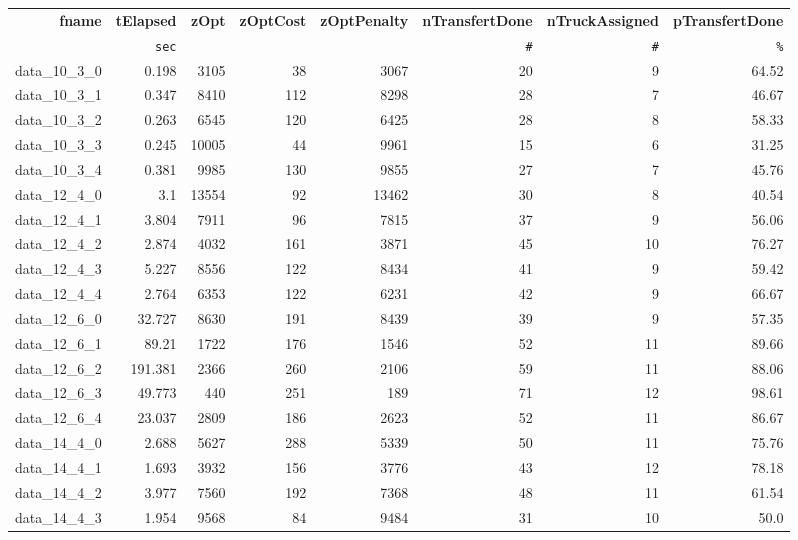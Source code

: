 \documentclass[preprint,12pt,authoryear]{elsarticle}
\begin{document}
\begin{table}[h!]
  \hspace{1.5cm}
  \vspace{0.5cm}
  \centering
{\tiny
\begin{tabular}{rrrrrrrr}
  \hline
  \textbf{fname} & \textbf{tElapsed} & \textbf{zOpt} & \textbf{zOptCost} & \textbf{zOptPenalty} & \textbf{nTransfertDone} & \textbf{nTruckAssigned} & \textbf{pTransfertDone} \\
  \texttt{ } & \texttt{sec} & \texttt{ } & \texttt{ } & \texttt{ } & \texttt{\#} & \texttt{\#} & \texttt{\%} \\\hline
  data\_10\_3\_0 & 0.198 & 3105 & 38 & 3067 & 20 & 9 & 64.52 \\
  data\_10\_3\_1 & 0.347 & 8410 & 112 & 8298 & 28 & 7 & 46.67 \\
  data\_10\_3\_2 & 0.263 & 6545 & 120 & 6425 & 28 & 8 & 58.33 \\
  data\_10\_3\_3 & 0.245 & 10005 & 44 & 9961 & 15 & 6 & 31.25 \\
  data\_10\_3\_4 & 0.381 & 9985 & 130 & 9855 & 27 & 7 & 45.76 \\
  data\_12\_4\_0 & 3.1 & 13554 & 92 & 13462 & 30 & 8 & 40.54 \\
  data\_12\_4\_1 & 3.804 & 7911 & 96 & 7815 & 37 & 9 & 56.06 \\
  data\_12\_4\_2 & 2.874 & 4032 & 161 & 3871 & 45 & 10 & 76.27 \\
  data\_12\_4\_3 & 5.227 & 8556 & 122 & 8434 & 41 & 9 & 59.42 \\
  data\_12\_4\_4 & 2.764 & 6353 & 122 & 6231 & 42 & 9 & 66.67 \\
  data\_12\_6\_0 & 32.727 & 8630 & 191 & 8439 & 39 & 9 & 57.35 \\
  data\_12\_6\_1 & 89.21 & 1722 & 176 & 1546 & 52 & 11 & 89.66 \\
  data\_12\_6\_2 & 191.381 & 2366 & 260 & 2106 & 59 & 11 & 88.06 \\
  data\_12\_6\_3 & 49.773 & 440 & 251 & 189 & 71 & 12 & 98.61 \\
  data\_12\_6\_4 & 23.037 & 2809 & 186 & 2623 & 52 & 11 & 86.67 \\
  data\_14\_4\_0 & 2.688 & 5627 & 288 & 5339 & 50 & 11 & 75.76 \\
  data\_14\_4\_1 & 1.693 & 3932 & 156 & 3776 & 43 & 12 & 78.18 \\
  data\_14\_4\_2 & 3.977 & 7560 & 192 & 7368 & 48 & 11 & 61.54 \\
  data\_14\_4\_3 & 1.954 & 9568 & 84 & 9484 & 31 & 10 & 50.0 \\

\end{tabular}}
\end{table}
\end{document}

